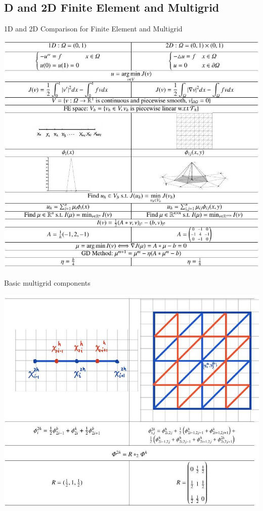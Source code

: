 \documentclass[10pt]{article}
\begin{document}
\subsection{D and 2D Finite Element and Multigrid}
1D and 2D Comparison for Finite Element and Multigrid

\includegraphics[max width=\textwidth]{2022_01_06_175a66d2121dcf20361ag-1}

Basic multigrid components

\includegraphics[max width=\textwidth]{2022_01_06_175a66d2121dcf20361ag-2}
\end{document}
